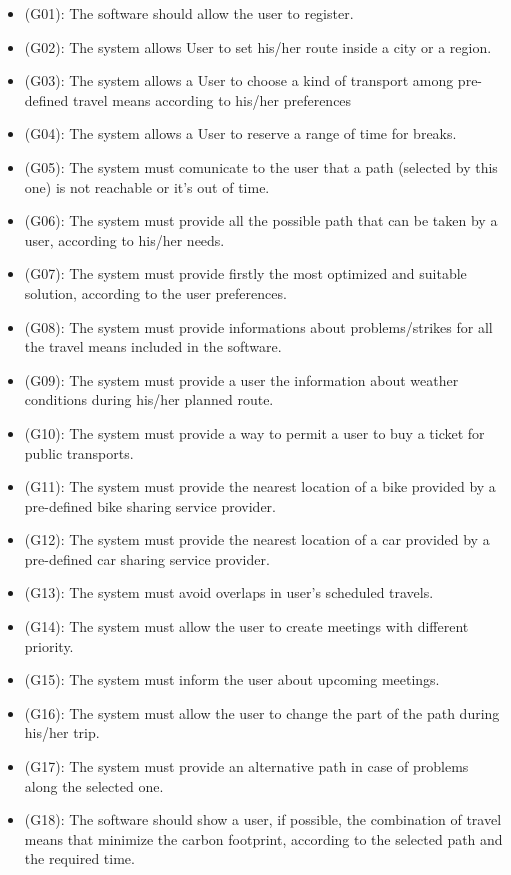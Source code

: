\documentclass[a4paper,leqno]{book}
\begin{document}
\begin{itemize}
\item (G01): The software should allow the user to register.
\item (G02): The system allows User to set his/her route inside a city or a region.
\item (G03): The system allows a User to choose a kind of transport among pre-defined travel means according to his/her preferences
\item (G04): The system allows a User to reserve a range of time for breaks.
\item (G05): The system must comunicate to the user that a path (selected by this one) is not reachable or it's out of time.
\item (G06): The system must provide all the possible path that can be taken by a user, according to his/her needs.
\item (G07): The system must provide firstly the most optimized and suitable solution, according to the user preferences.
\item (G08): The system must provide informations about problems/strikes for all the travel means  included in the software.
\item (G09): The system must provide a user the information about weather conditions during his/her planned route.
\item (G10): The system must provide a way to permit a user to buy a ticket for public transports.
\item (G11): The system must provide the nearest location of a bike provided by a pre-defined bike sharing service provider.
\item (G12): The system must provide the nearest location of a car provided by a pre-defined car sharing service provider.
\item (G13): The system must avoid overlaps in user's scheduled travels.
\item (G14): The system must allow the user to create meetings with different priority.
\item (G15): The system must inform the user about upcoming meetings.
\item (G16): The system must allow the user to change the part of the path during his/her trip.
\item (G17): The system must provide an alternative path in case of problems along the selected one.
\item (G18): The software should show a user, if possible, the combination of travel means that minimize the carbon footprint, according to the selected path and the required time.

\end{itemize}
\end{document}
